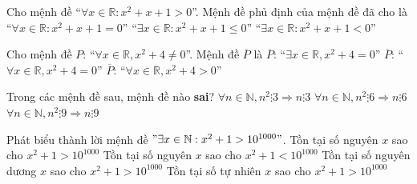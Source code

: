 \begin{ex}%
	Cho mệnh đề ``$\forall x \in  \mathbb{R} : x^2+x+1>0$''. Mệnh đề phủ định của mệnh đề đã cho là
		 {``$\forall x \in \mathbb{R} :x^2+x+1 = 0$''}
		{\True ``$\exists x \in \mathbb{R} :x^2+x+1  \le 0$''}
		{``$\exists x  \in \mathbb{R} :x^2+x+1 < 0$''}
\end{ex}

\begin{ex}%
	Cho  mệnh đề $P$: ``$\forall x \in \mathbb{R}, x^2+4 \ne 0$''. Mệnh đề $\overline{P}$ là
		{\True $\overline{P}$: ``$\exists x  \in \mathbb{R}, x^2+4 = 0$''}
		{$ \overline{P}$: ``$\forall x  \in \mathbb{R}, x^2+4 = 0$''}
		{$  \overline{P}$: ``$\forall x \in \mathbb{R}, x^2+4 > 0$''}
\end{ex}

\begin{ex}%
	Trong các mệnh đề sau, mệnh đề nào  \textbf{sai}?
		{$\forall n\in\mathbb{N}, n^2  \vdots 3\Rightarrow n \vdots 3$}
		{$\forall n\in\mathbb{N}, n^2 \vdots 6\Rightarrow  n \vdots 6$}
		 {\True $\forall n\in\mathbb{N}, n^2 \vdots 9\Rightarrow n \vdots 9$}
\end{ex}

\begin{ex}%
	Phát biểu thành lời mệnh đề $"\exists x \in \mathbb{N} : x^2  +1 >10^{1000}"$.
	 \choice
		 {Tồn tại số nguyên $x$ sao cho $x^2 +1 >10^{1000}$}
		{Tồn tại số nguyên $x$ sao  cho $x^2+1 < 10^{1000}$}
		{Tồn tại số  nguyên dương $x$ sao cho $x^2 +1 >10^{1000}$}
		{\True Tồn tại  số tự nhiên $x$ sao cho $ x^2 +1 >10^{1000}$}
\end{ex}

